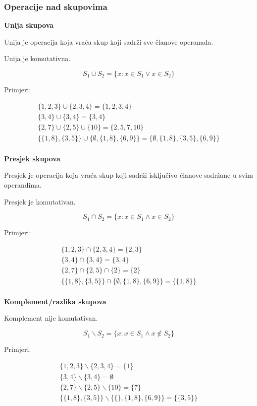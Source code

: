 \subsubsection{Operacije nad skupovima}

\noindent
\textbf{Unija skupova}

Unija je operacija koja vraća skup koji sadrži sve članove operanada. 

Unija je komutativna.

$$
S_1 \cup S_2 = \{x: x \in S_1 \lor x \in S_2\}
$$

Primjeri:

\begin{gather*}
    \{1, 2, 3\} \cup \{2, 3, 4\} = \{1, 2, 3, 4\} \\
    \{3, 4\} \cup \{3, 4\} = \{3, 4\} \\
    \{2, 7\} \cup \{2, 5\} \cup \{10\} = \{2, 5, 7, 10\} \\
    \{\{1, 8\}, \{3, 5\}\} \cup \{\emptyset, \{1, 8\}, \{6, 9\}\} = \{\emptyset,\{1, 8\}, \{3, 5\}, \{6, 9\}\} \\
\end{gather*}

\noindent
\textbf{Presjek skupova}

Presjek je operacija koja vraća skup koji sadrži isključivo članove sadržane u svim operandima. 

Presjek je komutativan.

$$
S_1 \cap S_2 = \{x: x \in S_1 \land x \in S_2\}
$$

Primjeri:

\begin{gather*}
    \{1, 2, 3\} \cap \{2, 3, 4\} = \{2, 3\} \\
    \{3, 4\} \cap \{3, 4\} = \{3, 4\} \\
    \{2, 7\} \cap \{2, 5\} \cap \{2\} = \{2\} \\
    \{\{1, 8\}, \{3, 5\}\} \cap \{\emptyset, \{1, 8\}, \{6, 9\}\} = \{\{1, 8\}\} \\
\end{gather*}

\noindent
\textbf{Komplement/razlika skupova}

Komplement nije komutativan.

$$
S_1 \backslash S_2 = \{x: x \in S_1 \land x \notin S_2\}
$$

Primjeri:

\begin{gather*}
    \{1, 2, 3\} \backslash \{2, 3, 4\} = \{1\} \\
    \{3, 4\} \backslash \{3, 4\} = \emptyset \\
    \{2, 7\} \backslash \{2, 5\} \backslash \{10\} = \{7\} \\
    \{\{1, 8\}, \{3, 5\}\} \backslash \{\{\}, \{1, 8\}, \{6, 9\}\} = \{\{3, 5\}\} \\
\end{gather*}

